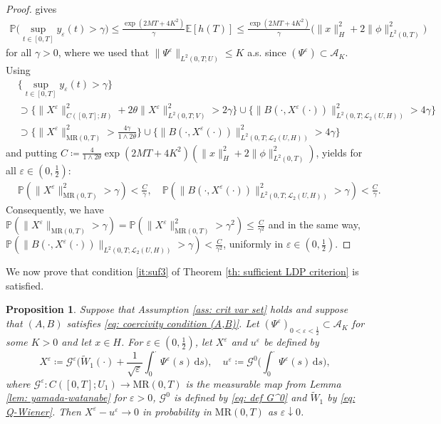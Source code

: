 \documentclass{amsart}
\newcommand{\dd}{\,\mathrm{d}}
\renewcommand{\MR}{\mathrm{MR}}
\newcommand{\UH}{\mathcal{L}_2(U,H)}
\newcommand{\<}{\langle}
\newcommand{\?}{\rangle}
\theoremstyle{plain}
\theoremstyle{remark}
\theoremstyle{plain}
\newtheorem{proposition}[theorem]{Proposition}
\numberwithin{equation}{section}
\newcommand{\E}{\mathbb{E}}
\newcommand{\G}{\mathcal{G}}
\renewcommand{\P}{\mathbb{P}}
\newcommand{\eps}{\varepsilon}
\begin{document}
\begin{proof}
gives 
\begin{align*}
\P\Big(\sup_{t\in[0,T]}y_\eps(t)>\gamma\Big)\leq \frac{\exp(2MT+4K^2)}{\gamma}\E[h(T)] \leq\frac{\exp(2MT+4K^2)}{\gamma}\big(\|x\|_H^2+2\|\phi\|_{L^2(0,T)}^2\big)
\end{align*}
for all $\gamma>0$, where we used that $\|\Psi^\eps\|_{L^2(0,T;U)}\leq K$ a.s. \!since $(\Psi^\eps)\subset \mathcal{A}_K$. Using
\begin{align*}
&\Big\{\sup_{t\in[0,T]}y_\eps(t)>\gamma\Big\}\\
&\supset \Big\{\|X^\eps\|_{C([0,T];H)}^2+2\theta\|X^\eps\|_{L^2(0,T;V)}^2>{2\gamma}\Big\}\cup \Big\{\| B(\cdot,X^\eps(\cdot))\|_{L^2(0,T;\UH)}^2>4\gamma\Big\}\\
&\supset \Big\{\|X^\eps\|_{\MR(0,T)}^2>\frac{4\gamma}{1\wedge 2\theta}\Big\}\cup \Big\{\| B(\cdot,X^\eps(\cdot))\|_{L^2(0,T;\UH)}^2>4\gamma\Big\}
\end{align*}
and putting $C\coloneqq \frac{4}{1\wedge 2\theta}\exp(2MT+4K^2)(\|x\|_H^2+2\|\phi\|_{L^2(0,T)}^2)$, yields for all $\eps\in(0,\frac{1}{2})$:
\begin{align*}
&\P(\|X^\eps\|_{\MR(0,T)}^2>\gamma)<\frac{C}{\gamma},\quad \P(\|B(\cdot,X^\eps(\cdot))\|_{L^2(0,T;\UH)}^2>\gamma)<\frac{C}{\gamma}.
\end{align*}
Consequently, we have  $\P(\|X^\eps\|_{\MR(0,T)}>\gamma)=\P(\|X^\eps\|_{\MR(0,T)}^2>\gamma^2)\leq \frac{C}{\gamma^2}$
and in the same way, $\P(\|B(\cdot,X^\eps(\cdot))\|_{L^2(0,T;\UH)}>\gamma)<\frac{C}{\gamma^2}$, uniformly in $\eps\in(0,\frac{1}{2})$.
\end{proof}


We now prove that condition \ref{it:suf3} of Theorem \ref{th: sufficient LDP criterion} is satisfied.


\begin{proposition}\label{prop: X^eps weak conv}
Suppose that Assumption \ref{ass: crit var set} holds and suppose that $(A,B)$ satisfies \eqref{eq: coercivity condition (A,B)}.
Let $(\Psi^\eps)_{0<\eps<\frac{1}{2}}\subset \mathcal{A}_K$  for some $K>0$ and let $x\in H$.
For $\eps\in(0,\frac{1}{2})$, let $X^\eps$ and $u^{\eps}$ be defined by
\[
X^{\eps}\coloneqq \mathcal{G}^{\eps}\Big({\tilde{W}_1}(\cdot)+\frac{1}{\sqrt{\eps}}\int_0^{\cdot}{\Psi}^{\eps}(s)\dd s\Big), \quad u^{\eps}\coloneqq \mathcal{G}^0\Big(\int_0^\cdot \Psi^\eps(s)\dd s\Big),
\]
where $\mathcal{G}^{\eps}:C([0,T];U_1)\to\MR(0,T)$ is the measurable map from Lemma \ref{lem: yamada-watanabe} for $\eps>0$, $\G^0$ is defined by \eqref{eq: def G^0} and $\tilde{W}_1$ by \eqref{eq: Q-Wiener}.
Then $X^\eps- u^{\eps}\to 0$ in probability in $\MR(0,T)$ as $\eps\downarrow0$.
\end{proposition}
\end{document}
